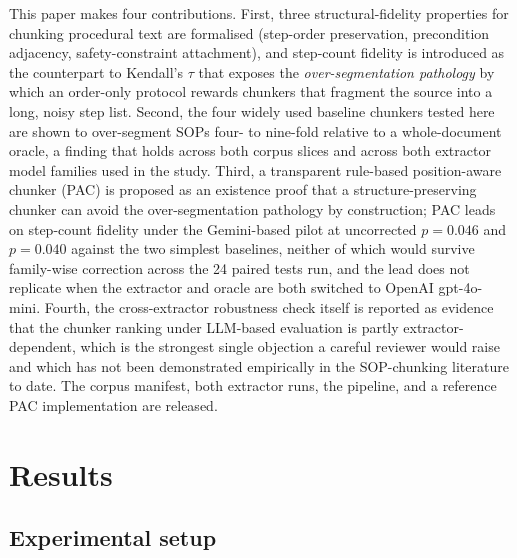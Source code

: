 \documentclass[fleqn,10pt]{wlscirep}
\begin{document}
This paper makes four contributions. First, three structural-fidelity
properties for chunking procedural text are formalised (step-order
preservation, precondition adjacency, safety-constraint attachment),
and step-count fidelity is introduced as the counterpart to Kendall's
$\tau$ that exposes the \emph{over-segmentation pathology} by which
an order-only protocol rewards chunkers that fragment the source into
a long, noisy step list. Second, the four widely used baseline
chunkers tested here are shown to over-segment SOPs four- to nine-fold
relative to a whole-document oracle, a finding that holds across both
corpus slices and across both extractor model families used in the
study. Third, a transparent rule-based position-aware chunker (PAC) is
proposed as an existence proof that a structure-preserving chunker can
avoid the over-segmentation pathology by construction; PAC leads on
step-count fidelity under the Gemini-based pilot at uncorrected
$p=0.046$ and $p=0.040$ against the two simplest baselines, neither of
which would survive family-wise correction across the 24 paired tests
run, and the lead does not replicate when the extractor and oracle are
both switched to OpenAI gpt-4o-mini. Fourth, the cross-extractor
robustness check itself is reported as evidence that the chunker
ranking under LLM-based evaluation is partly extractor-dependent,
which is the strongest single objection a careful reviewer would raise
and which has not been demonstrated empirically in the SOP-chunking
literature to date. The corpus manifest, both extractor runs, the
pipeline, and a reference PAC implementation are released.

\section*{Results}

\subsection*{Experimental setup}
\end{document}
